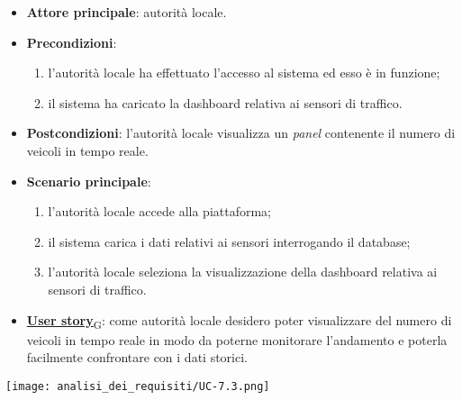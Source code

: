 \begin{itemize}
	\item \textbf{Attore principale}: autorità locale.
	\item \textbf{Precondizioni}:
	      \begin{enumerate}
		      \item l'autorità locale ha effettuato l'accesso al sistema ed esso è in funzione;
		      \item il sistema ha caricato la dashboard relativa ai sensori di traffico.
	      \end{enumerate}
	\item \textbf{Postcondizioni}: l'autorità locale visualizza un \textit{panel} contenente il numero di veicoli in tempo reale.
	\item \textbf{Scenario principale}:
	      \begin{enumerate}
		      \item l'autorità locale accede alla piattaforma;
		      \item il sistema carica i dati relativi ai sensori interrogando il database;
		      \item l'autorità locale seleziona la visualizzazione della dashboard relativa ai sensori di traffico.
	      \end{enumerate}
	\item \href{https://7last.github.io/docs/rtb/documentazione-interna/glossario\#user-story}{\textbf{User story}\textsubscript{G}}:
	      come autorità locale desidero poter visualizzare del numero di veicoli in tempo reale in modo da poterne monitorare l'andamento
	      e poterla facilmente confrontare con i dati storici.
\end{itemize}
\begin{center}
	\texttt{[image: analisi\_dei\_requisiti/UC-7.3.png]}
\end{center}


